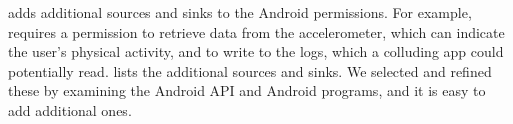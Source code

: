 \TheFlowChecker adds additional sources and sinks to the Android permissions.
For example, \theFlowChecker requires 
a permission to retrieve data from the accelerometer, which can indicate the user's
physical activity, and to write to the logs, which a colluding app could potentially read.
 lists
the additional sources and sinks.
We selected and refined these by examining the Android
API and Android programs, and it is easy to add additional ones.







%


